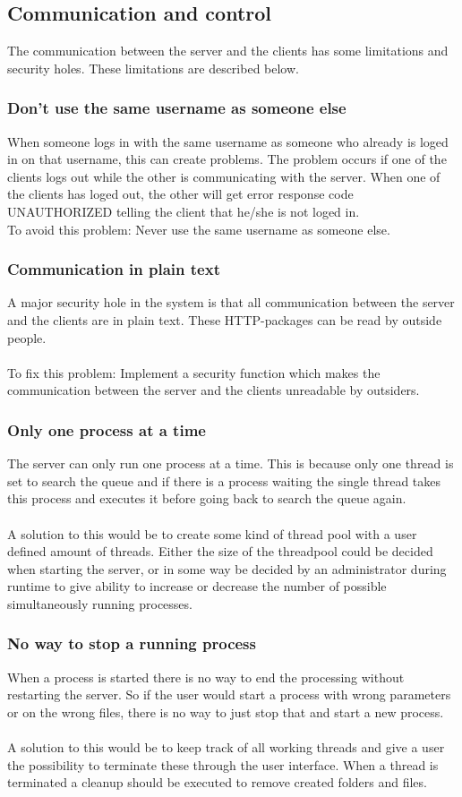 \subsection{Communication and control}
The communication between the server and the clients has some limitations and security holes. These limitations are described below.

\subsubsection{Don't use the same username as someone else}
When someone logs in with the same username as someone who already is loged in on that username, this can create problems. The problem occurs if one of the clients logs out while the other is communicating with the server. When one of the clients has loged out, the other will get error response code UNAUTHORIZED telling the client that he/she is not loged in.
\\To avoid this problem: Never use the same username as someone else.
\subsubsection{Communication in plain text}
A major security hole in the system is that all communication between the server and the clients are in plain text. These HTTP-packages can be read by outside people.\\
\\
To fix this problem: Implement a security function which makes the communication between the server and the clients unreadable by outsiders.
\subsubsection{Only one process at a time}
The server can only run one process at a time. This is because only one thread is set to search the queue and if there is a process waiting the single thread takes this process and executes it before going back to search the queue again.\\
\\
A solution to this would be to create some kind of thread pool with a user defined amount of threads. Either the size of the threadpool could be decided when starting the server, or in some way be decided by an administrator during runtime to give ability to increase or decrease the number of possible simultaneously running processes.
\subsubsection{No way to stop a running process}
When a process is started there is no way to end the processing without restarting the server. So if the user would start a process with wrong parameters or on the wrong files, there is no way to just stop that and start a new process.\\
\\
A solution to this would be to keep track of all working threads and give a user the possibility to terminate these through the user interface. When a thread is terminated a cleanup should be executed to remove created folders and files.
